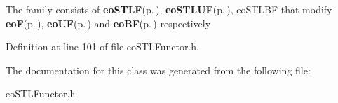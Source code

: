 The family consists of {\bf eo\-STLF}{\rm (p.\,\pageref{classeo_s_t_l_f})}, {\bf eo\-STLUF}{\rm (p.\,\pageref{classeo_s_t_l_u_f})}, eo\-STLBF that modify {\bf eo\-F}{\rm (p.\,\pageref{classeo_f})}, {\bf eo\-UF}{\rm (p.\,\pageref{classeo_u_f})} and {\bf eo\-BF}{\rm (p.\,\pageref{classeo_b_f})} respectively 



Definition at line 101 of file eo\-STLFunctor.h.

The documentation for this class was generated from the following file:\begin{CompactItemize}
\item 
eo\-STLFunctor.h\end{CompactItemize}

